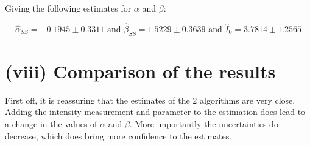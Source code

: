 \documentclass[12pt]{report} %
\begin{document}
Giving the following estimates for $\alpha$ and $\beta$:

\begin{equation}
    \hat{\alpha}_{SS} = -0.1945 \pm 0.3311 \text{ and } \hat{\beta}_{SS} = 1.5229 \pm 0.3639 \text{ and } \hat{I}_{0} = 3.7814 \pm 1.2565
\end{equation}


\chapter{(viii) Comparison of the results}

First off, it is reassuring that the estimates of the 2 algorithms are very close. Adding the intensity measurement and parameter to the estimation does lead to a change in the values of $\alpha$ and $\beta$. More importantly the uncertainties do decrease, which does bring more confidence to the estimates.



\end{document}
